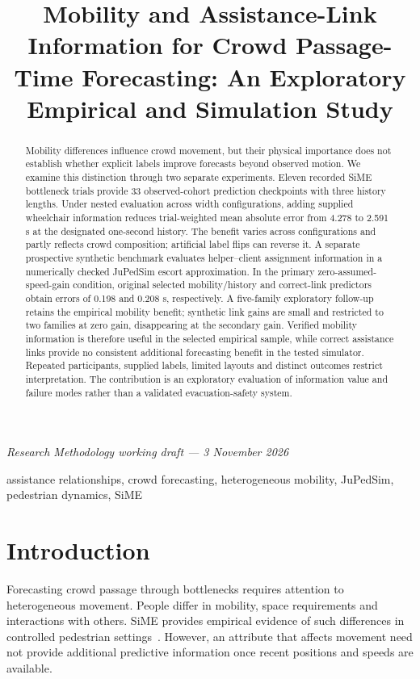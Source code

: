 \documentclass[conference]{IEEEtran}
\title{Mobility and Assistance-Link Information for Crowd Passage-Time Forecasting: An Exploratory Empirical and Simulation Study}
\author{\IEEEauthorblockN{Surya Maheswaran, Yashaswini Pawar, Sohan Kori, and Seema B. Hegde}
\IEEEauthorblockA{School of Computer Science and Engineering, RV University\\Bengaluru, Karnataka, India}}
\begin{document}
\maketitle
\begin{center}\small\textit{Research Methodology working draft --- 3 November 2026}\end{center}
\begin{abstract}
Mobility differences influence crowd movement, but their physical importance does not establish whether explicit labels improve forecasts beyond observed motion. We examine this distinction through two separate experiments. Eleven recorded SiME bottleneck trials provide 33 observed-cohort prediction checkpoints with three history lengths. Under nested evaluation across width configurations, adding supplied wheelchair information reduces trial-weighted mean absolute error from 4.278 to 2.591 s at the designated one-second history. The benefit varies across configurations and partly reflects crowd composition; artificial label flips can reverse it. A separate prospective synthetic benchmark evaluates helper--client assignment information in a numerically checked JuPedSim escort approximation. In the primary zero-assumed-speed-gain condition, original selected mobility/history and correct-link predictors obtain errors of 0.198 and 0.208 s, respectively. A five-family exploratory follow-up retains the empirical mobility benefit; synthetic link gains are small and restricted to two families at zero gain, disappearing at the secondary gain. Verified mobility information is therefore useful in the selected empirical sample, while correct assistance links provide no consistent additional forecasting benefit in the tested simulator. Repeated participants, supplied labels, limited layouts and distinct outcomes restrict interpretation. The contribution is an exploratory evaluation of information value and failure modes rather than a validated evacuation-safety system.
\end{abstract}
\begin{IEEEkeywords}assistance relationships, crowd forecasting, heterogeneous mobility, JuPedSim, pedestrian dynamics, SiME\end{IEEEkeywords}

\section{Introduction}
Forecasting crowd passage through bottlenecks requires attention to heterogeneous movement. People differ in mobility, space requirements and interactions with others. SiME provides empirical evidence of such differences in controlled pedestrian settings~\cite{sime,geoerg}. However, an attribute that affects movement need not provide additional predictive information once recent positions and speeds are available.
\end{document}

